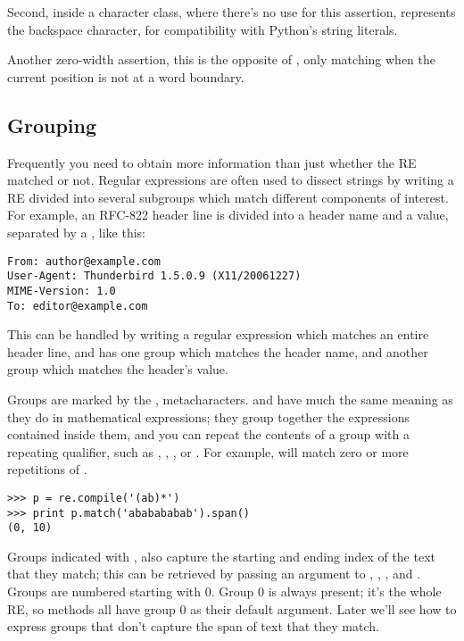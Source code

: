 \documentclass{howto}
\begin{document}
\begin{list}{}{}
Second, inside a character class, where there's no use for this
assertion,  represents the backspace character, for
compatibility with Python's string literals.

\item[\regexp{\e B}] Another zero-width assertion, this is the
opposite of , only matching when the current
position is not at a word boundary.

\end{list}

\subsection{Grouping}

Frequently you need to obtain more information than just whether the
RE matched or not.  Regular expressions are often used to dissect
strings by writing a RE divided into several subgroups which
match different components of interest.  For example, an RFC-822
header line is divided into a header name and a value, separated by a
\character{:}, like this:

\begin{verbatim}
From: author@example.com
User-Agent: Thunderbird 1.5.0.9 (X11/20061227)
MIME-Version: 1.0
To: editor@example.com
\end{verbatim}

This can be handled by writing a regular expression
which matches an entire header line, and has one group which matches the
header name, and another group which matches the header's value.

Groups are marked by the \character{(}, \character{)} metacharacters.
\character{(} and \character{)} have much the same meaning as they do
in mathematical expressions; they group together the expressions
contained inside them, and you can repeat the contents of a
group with a repeating qualifier, such as \regexp{*}, \regexp{+},
, or .  For example,
 will match zero or more repetitions of .

\begin{verbatim}
>>> p = re.compile('(ab)*')
>>> print p.match('ababababab').span()
(0, 10)
\end{verbatim}

Groups indicated with \character{(}, \character{)} also capture the
starting and ending index of the text that they match; this can be
retrieved by passing an argument to ,
, , and .  Groups are
numbered starting with 0.  Group 0 is always present; it's the whole
RE, so  methods all have group 0 as their default
argument.  Later we'll see how to express groups that don't capture
the span of text that they match.
\end{document}
